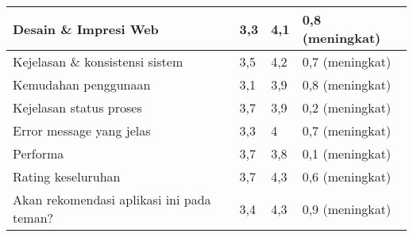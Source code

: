 \begin{longtable}{|X|X|X|X|}
Desain \& Impresi Web	&	3,3	&	4,1	&	{\color[HTML]{009901}0,8	(meningkat)}\\ \hline
Kejelasan \& konsistensi sistem	&	3,5	&	4,2	&	{\color[HTML]{009901}0,7 (meningkat)}	\\ \hline
Kemudahan penggunaan	&	3,1	&	3,9	&	{\color[HTML]{009901}0,8 (meningkat)}	\\ \hline
Kejelasan status proses	&	3,7	&	3,9	&	{\color[HTML]{009901}0,2 (meningkat)}	\\ \hline
Error message yang jelas	&	3,3	&	4	&	{\color[HTML]{009901}0,7 (meningkat)}	\\ \hline
Performa	&	3,7	&	3,8	&	{\color[HTML]{009901} 0,1 (meningkat)}	\\ \hline
Rating keseluruhan	&	3,7	&	4,3	&	{\color[HTML]{009901}0,6 (meningkat)}	\\ \hline
Akan rekomendasi aplikasi ini pada teman?	&	3,4	&	4,3	&	{\color[HTML]{009901}0,9 (meningkat)}	\\ \hline

\end{longtable}